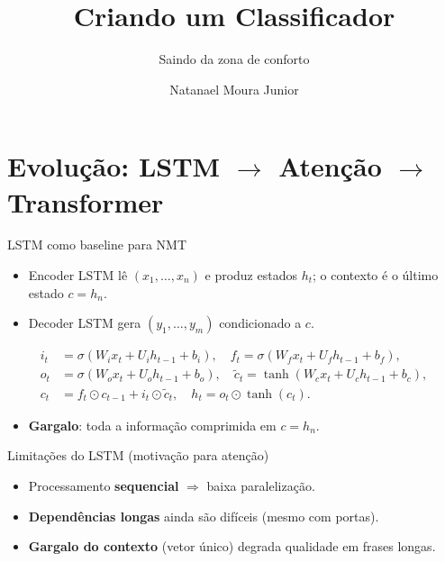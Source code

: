 \documentclass{beamer}
\title{Criando um Classificador}
\subtitle{Saindo da zona de conforto}
\author{Natanael Moura Junior}
\begin{document}
\maketitle


\section{Evolução: LSTM \texorpdfstring{$\rightarrow$}{->} Atenção \texorpdfstring{$\rightarrow$}{->} Transformer}

\begin{frame}{LSTM como baseline para NMT}
\begin{itemize}
  \item Encoder LSTM lê $(x_1,\dots,x_n)$ e produz estados $h_t$; o contexto é o último estado $c=h_n$.
  \item Decoder LSTM gera $(y_1,\dots,y_m)$ condicionado a $c$.
\end{itemize}
\[
\begin{aligned}
 i_t &= \sigma(W_i x_t + U_i h_{t-1} + b_i),\quad
 f_t = \sigma(W_f x_t + U_f h_{t-1} + b_f),\\
 o_t &= \sigma(W_o x_t + U_o h_{t-1} + b_o),\quad
 \tilde{c}_t = \tanh(W_c x_t + U_c h_{t-1} + b_c),\\
 c_t &= f_t \odot c_{t-1} + i_t \odot \tilde{c}_t,\quad
 h_t = o_t \odot \tanh(c_t).
\end{aligned}
\]
\begin{itemize}
  \item \textbf{Gargalo}: toda a informação comprimida em $c=h_n$.
\end{itemize}
\end{frame}

\begin{frame}{Limitações do LSTM (motivação para atenção)}
\begin{itemize}
  \item Processamento \textbf{sequencial} $\Rightarrow$ baixa paralelização.
  \item \textbf{Dependências longas} ainda são difíceis (mesmo com portas).
  \item \textbf{Gargalo do contexto} (vetor único) degrada qualidade em frases longas.
\end{itemize}
\end{frame}
\end{document}
